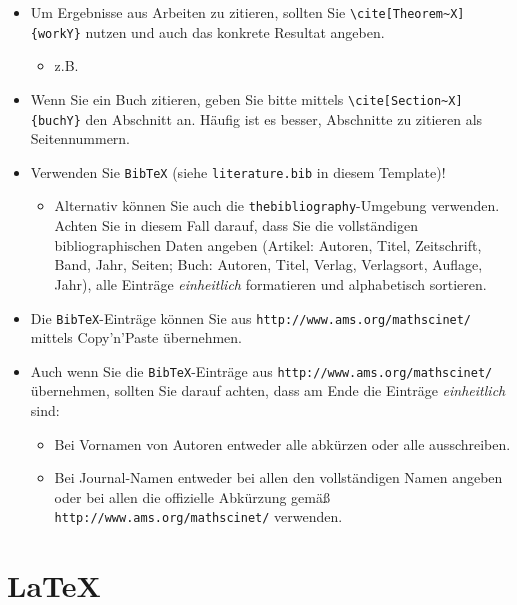 \documentclass[a4paper,11pt,bibliography=totoc,listof=totoc,headinclude=true,cleardoublepage=empty,oneside]{scrbook}
\begin{document}
{\color{change}
\begin{itemize}
\item Um Ergebnisse aus Arbeiten zu zitieren, sollten Sie \verb$\cite[Theorem~X]{workY}$ nutzen und auch das konkrete Resultat angeben.
\begin{itemize}
\item z.B.\ \cite[Theorem~4]{MR3457440}
\end{itemize}

\item Wenn Sie ein Buch zitieren, geben Sie bitte mittels \verb$\cite[Section~X]{buchY}$
den Abschnitt an. Häufig ist es besser, Abschnitte zu zitieren als Seitennummern.

\item Verwenden Sie \verb$BibTeX$ (siehe \verb$literature.bib$ in diesem Template)!
\begin{itemize}
\item Alternativ können Sie auch die \verb$thebibliography$-Umgebung verwenden. Achten Sie in diesem Fall darauf, dass Sie die vollständigen bibliographischen Daten angeben (Artikel: Autoren, Titel, Zeitschrift, Band, Jahr, Seiten; Buch: Autoren, Titel, Verlag, Verlagsort, Auflage, Jahr), alle Einträge \emph{einheitlich} formatieren und alphabetisch sortieren. 
\end{itemize}

\item Die \verb$BibTeX$-Einträge können Sie aus \verb$http://www.ams.org/mathscinet/$ mittels Copy'n'Paste überneh\-men.
\item Auch wenn Sie die \verb$BibTeX$-Einträge aus \verb$http://www.ams.org/mathscinet/$ über\-neh\-men, sollten Sie darauf achten, dass am Ende die Einträge \emph{einheitlich} sind:
\begin{itemize}
\item Bei Vornamen von Autoren entweder alle abkürzen oder alle ausschreiben. 
\item Bei Journal-Namen entweder bei allen den vollständigen Namen angeben oder
bei allen die offizielle Abkürzung gemäß \verb$http://www.ams.org/mathscinet/$ verwenden.
\end{itemize}


\end{itemize}
}

\section{LaTeX}
\end{document}
